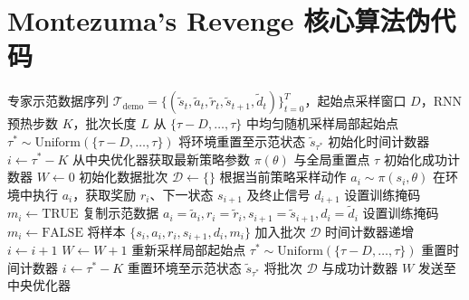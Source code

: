 \documentclass{article}
\begin{document}
\section*{Montezuma's Revenge 核心算法伪代码}

\begin{algorithm}[H]
\caption{基于示范初始化的采样工作进程 (Demonstration-Initialized Rollout Worker)}
\label{alg:rollout_worker}
\begin{algorithmic}[1]
\Require 专家示范数据序列 $\mathcal{T}_{\text{demo}} = \{(\tilde{s}_t, \tilde{a}_t, \tilde{r}_t, \tilde{s}_{t+1}, \tilde{d}_t)\}_{t=0}^T$，起始点采样窗口 $D$，RNN 预热步数 $K$，批次长度 $L$
\State 从 $\{\tau - D, \dots, \tau\}$ 中均匀随机采样局部起始点 $\tau^* \sim \text{Uniform}(\{\tau - D, \dots, \tau\})$
\State 将环境重置至示范状态 $\tilde{s}_{\tau^*}$
\State 初始化时间计数器 $i \leftarrow \tau^* - K$
    \State 从中央优化器获取最新策略参数 $\pi(\theta)$ 与全局重置点 $\tau$
    \State 初始化成功计数器 $W \leftarrow 0$
    \State 初始化数据批次 $\mathcal{D} \leftarrow \{\}$
         
            \State 根据当前策略采样动作 $a_i \sim \pi(s_i, \theta)$
            \State 在环境中执行 $a_i$，获取奖励 $r_i$、下一状态 $s_{i+1}$ 及终止信号 $d_{i+1}$
            \State 设置训练掩码 $m_i \leftarrow \text{TRUE}$ 
        \Else {}
            \State 复制示范数据 $a_i = \tilde{a}_i, r_i = \tilde{r}_i, s_{i+1} = \tilde{s}_{i+1}, d_i = \tilde{d}_i$
            \State 设置训练掩码 $m_i \leftarrow \text{FALSE}$ 
        \EndIf
        \State 将样本 $\{s_i, a_i, r_i, s_{i+1}, d_i, m_i\}$ 加入批次 $\mathcal{D}$
        \State 时间计数器递增 $i \leftarrow i + 1$
         
             
                \State $W \leftarrow W + 1$
            \EndIf
            \State 重新采样局部起始点 $\tau^* \sim \text{Uniform}(\{\tau - D, \dots, \tau\})$
            \State 重置时间计数器 $i \leftarrow \tau^* - K$
            \State 重置环境至示范状态 $\tilde{s}_{\tau^*}$
        \EndIf
    \EndFor
    \State 将批次 $\mathcal{D}$ 与成功计数器 $W$ 发送至中央优化器
\EndWhile
\end{algorithmic}
\end{algorithm}

\vspace{1em}
\end{document}
